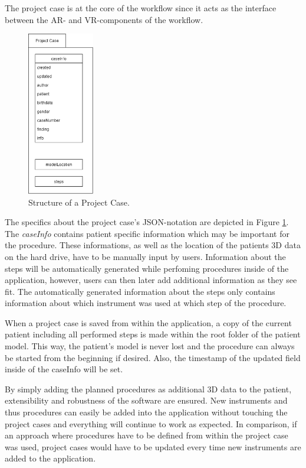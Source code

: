The project case is at the core of the workflow since it acts as the interface between the AR- and VR-components of the workflow.

\begin{figure}[ht]
    \centering
    \includegraphics[width=110px]{images/implementation/project_case.png}
    \caption{\label{fig::ImplementationProjectCase}Structure of a Project Case.}
\end{figure}

The specifics about the project case's JSON-notation are depicted in Figure \ref{fig::ImplementationProjectCase}.
The \emph{caseInfo} contains patient specific information which may be important for the procedure.
These informations, as well as the location of the patients 3D data on the hard drive, have to be manually input by users.
Information about the steps will be automatically generated while perfoming procedures inside of the application, however, users can then later add additional information as they see fit.
The automatically generated information about the steps only contains information about which instrument was used at which step of the procedure.

When a project case is saved from within the application, a copy of the current patient including all performed steps is made within the root folder of the patient model.
This way, the patient's model is never lost and the procedure can always be started from the beginning if desired.
Also, the timestamp of the updated field inside of the caseInfo will be set.

By simply adding the planned procedures as additional 3D data to the patient, extensibility and robustness of the software are ensured.
New instruments and thus procedures can easily be added into the application without touching the project cases and everything will continue to work as expected.
In comparison, if an approach where procedures have to be defined from within the project case was used, project cases would have to be updated every time new 
instruments are added to the application.